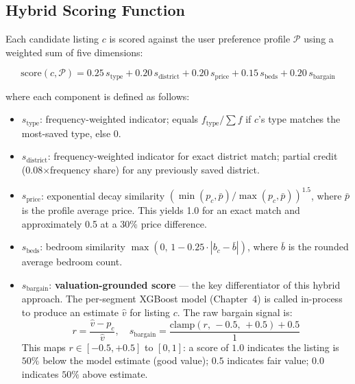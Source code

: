 \subsection{Hybrid Scoring Function}

Each candidate listing $c$ is scored against the user preference profile $\mathcal{P}$
using a weighted sum of five dimensions:

\begin{equation}
\text{score}(c, \mathcal{P}) =
  0.25\,s_{\text{type}} +
  0.20\,s_{\text{district}} +
  0.20\,s_{\text{price}} +
  0.15\,s_{\text{beds}} +
  0.20\,s_{\text{bargain}}
\label{eq:rec_score}
\end{equation}

\noindent where each component is defined as follows:

\begin{itemize}
    \item $s_{\text{type}}$: frequency-weighted indicator; equals
    $f_{\text{type}} / \sum f$ if $c$'s type matches the most-saved type,
    else 0.

    \item $s_{\text{district}}$: frequency-weighted indicator for exact district
    match; partial credit (0.08$\times$frequency share) for any previously saved
    district.

    \item $s_{\text{price}}$: exponential decay similarity
    $(\min(p_c, \bar{p}) / \max(p_c, \bar{p}))^{1.5}$, where $\bar{p}$ is
    the profile average price. This yields 1.0 for an exact match and
    approximately 0.5 at a 30\% price difference.

    \item $s_{\text{beds}}$: bedroom similarity
    $\max(0,\,1 - 0.25 \cdot |b_c - \bar{b}|)$, where $\bar{b}$ is the
    rounded average bedroom count.

    \item $s_{\text{bargain}}$: \textbf{valuation-grounded score} — the key differentiator of this hybrid approach. The per-segment XGBoost model 
    (Chapter~4) is called in-process to produce an estimate $\hat{v}$ for 
    listing $c$. The raw bargain signal is:
    \[
        r = \frac{\hat{v} - p_c}{\hat{v}}, \quad
        s_{\text{bargain}} = \frac{\text{clamp}(r,\,-0.5,\,+0.5) + 0.5}{1}
    \]
    This maps $r \in [-0.5, +0.5]$ to $[0, 1]$: a score of $1.0$ indicates 
    the listing is $50\%$ below the model estimate (good value); $0.5$ 
    indicates fair value; $0.0$ indicates $50\%$ above estimate.
\end{itemize}

